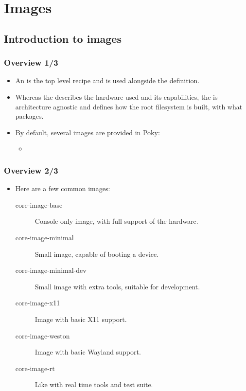 \section{Images}
\subsection{Introduction to images}

\begin{frame}
  \frametitle{Overview 1/3}
  \begin{itemize}
    \item An  is the top level recipe and is used
      alongside the  definition.
    \item Whereas the  describes the hardware used and
      its capabilities, the  is architecture agnostic and
      defines how the root filesystem is built, with what packages.
    \item By default, several images are provided in Poky:
      \begin{itemize}
        \item {}
      \end{itemize}
  \end{itemize}
\end{frame}

\begin{frame}
  \frametitle{Overview 2/3}
  \begin{itemize}
    \item Here are a few common images:
      \begin{description}
        \item[core-image-base] Console-only image, with full support
          of the hardware.
        \item[core-image-minimal] Small image, capable of booting a
          device.
        \item[core-image-minimal-dev] Small image with extra tools,
          suitable for development.
        \item[core-image-x11] Image with basic X11 support.
        \item[core-image-weston] Image with basic Wayland support.
        \item[core-image-rt] Like  with real time
          tools and test suite.
      \end{description}
  \end{itemize}
\end{frame}

